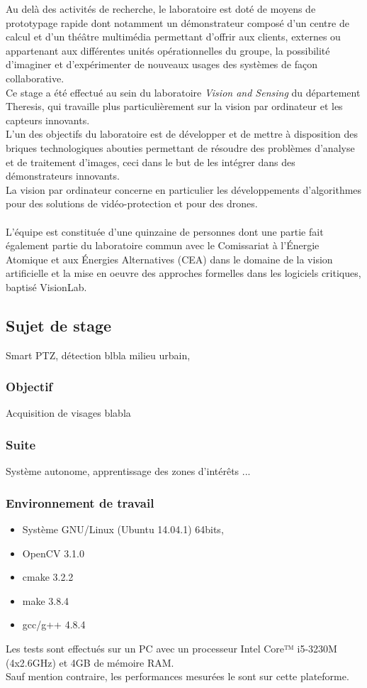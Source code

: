 \documentclass[12pt]{article}
\begin{document}
Au delà des activités de recherche, le laboratoire est doté de moyens de prototypage rapide dont notamment un démonstrateur composé d'un centre de calcul et d'un théâtre multimédia permettant d'offrir aux clients, externes ou appartenant aux différentes unités opérationnelles du groupe, la possibilité d'imaginer et d'expérimenter de nouveaux usages des systèmes de façon collaborative. \\
Ce stage a été effectué au sein du laboratoire \textit{Vision and Sensing} du département Theresis, qui travaille plus particulièrement sur la vision par ordinateur et les capteurs innovants.\\
L'un des objectifs du laboratoire est de développer et de mettre à disposition des briques technologiques abouties permettant de résoudre des problèmes d'analyse et de traitement d'images, ceci dans le but de les intégrer dans des démonstrateurs innovants.\\
La vision par ordinateur concerne en particulier les développements d'algorithmes pour des solutions de vidéo-protection et pour des drones. \\
\\
L'équipe est constituée d'une quinzaine de personnes dont une partie fait également partie du laboratoire commun avec le Comissariat à l'Énergie Atomique et aux Énergies Alternatives (CEA) dans le domaine de la vision artificielle et la mise en oeuvre des approches formelles dans les logiciels critiques, baptisé VisionLab.
\pagebreak
\subsection{Sujet de stage}
Smart PTZ, détection blbla milieu urbain,
\subsubsection{Objectif}
Acquisition de visages blabla
\subsubsection{Suite}
Système autonome, apprentissage des zones d'intérêts ...
\subsubsection{Environnement de travail}
\begin{itemize}
\item Système GNU/Linux (Ubuntu 14.04.1) 64bits, 
\item OpenCV 3.1.0
\item cmake 3.2.2
\item make 3.8.4
\item gcc/g++ 4.8.4
\end{itemize}
Les tests sont effectués sur un PC avec un processeur Intel Core™ i5-3230M (4x2.6GHz) et 4GB de mémoire RAM.\\
Sauf mention contraire, les performances mesurées le sont sur cette plateforme.
\pagebreak
\end{document}
